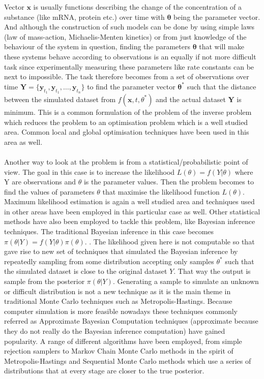 \documentclass[12pt,a4paper,titlepage, fullpage]{article}
\begin{document}
Vector $\mathbf{x}$ is usually functions describing the change of the concentration of a substance (like mRNA, protein etc.) over time with $\mathbf{\theta}$ being the parameter vector. And although the construction of such models can be done by using simple laws (law of mass-action, Michaelis-Menten kinetics) or from just knowledge of the behaviour of the system in question, finding the parameters $\mathbf{\theta}$ that will make these systems behave according to observations is an equally if not more difficult task since experimentally measuring these parameters like rate constants can be next to impossible. The task therefore becomes from a set of observations over time $\mathbf{Y} = \{\mathbf{y}_{t_{1}}, \mathbf{y}_{t_{1}}, \dots, \mathbf{y}_{t_{n}}\} $ to find the parameter vector $\mathbf{\theta}^*$ such that the distance between the simulated dataset from $f(\mathbf{x}, t, \theta^*)$ and the actual dataset $\mathbf{Y}$ is minimum. This is a common formulation of the problem of the inverse problem which reduces the problem to an optimisation problem which is a well studied area\cite{gonze2011modeling}. Common local and global optimisation techniques have been used in this area as well\cite{moles2003parameter}.\\
\noindent
\\
Another way to look at the problem is from a statistical/probabilistic point of view. The goal in this case is to increase the likelihood $L(\theta) = f(Y|\theta)$ where Y are observations and $\theta$ is the parameter values\cite{filippi2011optimal}. Then the problem becomes to find the values of parameters $\theta$ that maximise the likelihood function $L(\theta)$. Maximum likelihood estimation is again a well studied area and techniques used in other areas have been employed in this particular case as well.%
Other statistical methods have also been employed to tackle this problem, like Bayesian inference techniques. The traditional Bayesian inference in this case becomes $\pi(\theta| Y)  = f(Y |\theta) \pi(\theta)$. \cite{toni2009abc}. The likelihood given here is not computable so that gave rise to new set of techniques that simulated the Bayesian inference by repeatedly sampling from some distribution accepting only samples  $\theta^*$ such that the simulated dataset is close to the original dataset $Y$. That way the output is sample from the posterior $\pi(\theta | Y)$. Generating a sample to simulate an unknown or difficult distribution is not a new technique as it is the main theme in traditional Monte Carlo techniques such as Metropolis-Hastings\cite{Walsh04markovchain}. Because computer simulation is more feasible nowadays these techniques commonly referred as Approximate Bayesian Computation techniques (approximate because they do not really do the Bayesian inference computation) have gained popularity. A range of different algorithms have been employed, from simple rejection samplers\cite{pritchard1999population} to Markov Chain Monte Carlo methods in the spirit of Metropolis-Hastings\cite{marjoram2003markov} and Sequential Monte Carlo methods which use a series of distributions that at every stage are closer to the true posterior\cite{toni2009abc}.\\
\end{document}
